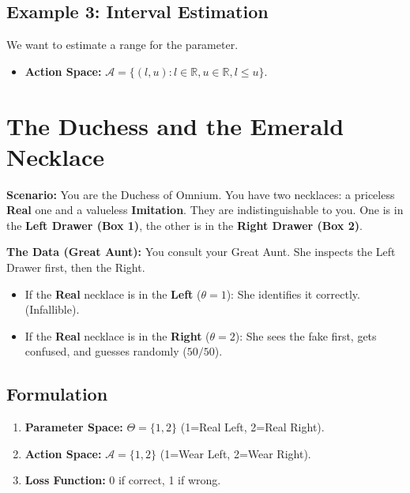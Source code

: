 \documentclass[
  letterpaper,
  DIV=11,
  numbers=noendperiod]{scrreprt}
\providecommand{\tightlist}{%
  \setlength{\itemsep}{0pt}\setlength{\parskip}{0pt}}
\renewcommand{\[}{\begin{equation}}
\renewcommand{\]}{\end{equation}}
\theoremstyle{definition}
\theoremstyle{plain}
\theoremstyle{plain}
\theoremstyle{plain}
\theoremstyle{definition}
\theoremstyle{plain}
\theoremstyle{remark}
\begin{document}
\subsection{Example 3: Interval
Estimation}\label{example-3-interval-estimation}

We want to estimate a range for the parameter.

\begin{itemize}
\tightlist
\item
  \textbf{Action Space:}
  \(\mathcal{A} = \{(l, u) : l \in \mathbb{R}, u \in \mathbb{R}, l \le u\}\).
\end{itemize}

\section{The Duchess and the Emerald Necklace}\label{sec-necklace}

\textbf{Scenario:} You are the Duchess of Omnium. You have two
necklaces: a priceless \textbf{Real} one and a valueless
\textbf{Imitation}. They are indistinguishable to you. One is in the
\textbf{Left Drawer (Box 1)}, the other is in the \textbf{Right Drawer
(Box 2)}.

\textbf{The Data (Great Aunt):} You consult your Great Aunt. She
inspects the Left Drawer first, then the Right.

\begin{itemize}
\tightlist
\item
  If the \textbf{Real} necklace is in the \textbf{Left} (\(\theta=1\)):
  She identifies it correctly. (Infallible).
\item
  If the \textbf{Real} necklace is in the \textbf{Right} (\(\theta=2\)):
  She sees the fake first, gets confused, and guesses randomly
  (\(50/50\)).
\end{itemize}

\subsection{Formulation}\label{formulation}

\begin{enumerate}
\def\labelenumi{\arabic{enumi}.}
\tightlist
\item
  \textbf{Parameter Space:} \(\Theta = \{1, 2\}\) (1=Real Left, 2=Real
  Right).
\item
  \textbf{Action Space:} \(\mathcal{A} = \{1, 2\}\) (1=Wear Left, 2=Wear
  Right).
\item
  \textbf{Loss Function:} 0 if correct, 1 if wrong.
\end{enumerate}
\end{document}
